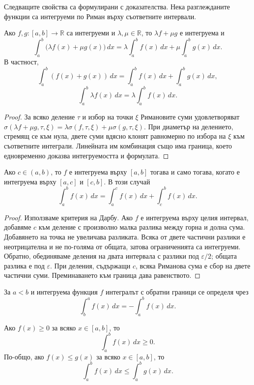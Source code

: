 Следващите свойства са формулирани с доказателства. Нека разглежданите функции са интегруеми по Риман върху съответните интервали.

\begin{prop}[Линейност]
Ако $f,g\colon[a,b]\to\mathbb{R}$ са интегруеми и $\lambda,\mu\in\mathbb{R}$, то $\lambda f+\mu g$ е интегруема и
\[
\int_a^b\bigl(\lambda f(x)+\mu g(x)\bigr)\,dx
=
\lambda\int_a^b f(x)\,dx
+
\mu\int_a^b g(x)\,dx.
\]
В частност,
\[
\int_a^b(f(x)+g(x))\,dx
=
\int_a^b f(x)\,dx+\int_a^b g(x)\,dx,
\]
\[
\int_a^b\lambda f(x)\,dx
=
\lambda\int_a^b f(x)\,dx.
\]
\end{prop}

\begin{proof}
За всяко деление $\tau$ и избор на точки $\xi$ Римановите суми удовлетворяват $\sigma(\lambda f+\mu g,\tau,\xi)=\lambda\sigma(f,\tau,\xi)+\mu\sigma(g,\tau,\xi)$. При диаметър на делението, стремящ се към нула, двете суми вдясно клонят равномерно по избора на $\xi$ към съответните интеграли. Линейната им комбинация също има граница, което едновременно доказва интегруемостта и формулата.
\end{proof}

\begin{prop}
Ако $c\in(a,b)$, то $f$ е интегруема върху $[a,b]$ тогава и само тогава, когато е интегруема върху $[a,c]$ и $[c,b]$. В този случай
\[
\int_a^b f(x)\,dx
=
\int_a^c f(x)\,dx+\int_c^b f(x)\,dx.
\]
\end{prop}

\begin{proof}
Използваме критерия на Дарбу. Ако $f$ е интегруема върху целия интервал, добавяме $c$ към деление с произволно малка разлика между горна и долна сума. Добавянето на точка не увеличава разликата. Всяка от двете частични разлики е неотрицателна и не по-голяма от общата, затова ограниченията са интегруеми. Обратно, обединяваме деления на двата интервала с разлики под $\varepsilon/2$; общата разлика е под $\varepsilon$. При деления, съдържащи $c$, всяка Риманова сума е сбор на двете частични суми. Преминаването към граница дава равенството.
\end{proof}

\begin{defn}
За $a<b$ и интегруема функция $f$ интегралът с обратни граници се определя чрез
\[
\int_b^a f(x)\,dx=-\int_a^b f(x)\,dx.
\]
\end{defn}

\begin{prop}
Ако $f(x)\geq0$ за всяко $x\in[a,b]$, то
\[
\int_a^b f(x)\,dx\geq0.
\]
По-общо, ако $f(x)\leq g(x)$ за всяко $x\in[a,b]$, то
\[
\int_a^b f(x)\,dx\leq\int_a^b g(x)\,dx.
\]
\end{prop}

